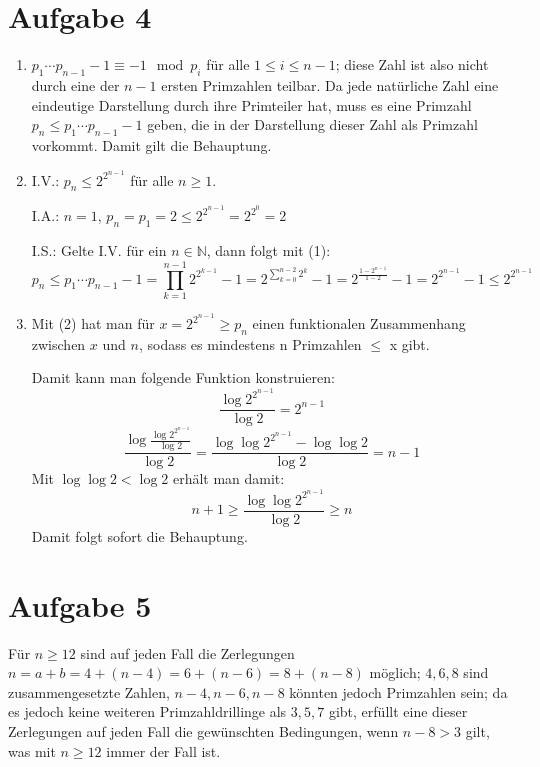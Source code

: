 \section*{Aufgabe 4}
\begin{enumerate}[(1)]
\item
$p_1\cdots p_{n-1} - 1 \equiv -1 \mod p_i$ für alle $ 1 \leq i \leq n-1$; diese Zahl ist also nicht durch eine der $n-1$ ersten Primzahlen teilbar.
Da jede natürliche Zahl eine eindeutige Darstellung durch ihre Primteiler hat, muss es eine Primzahl $p_n \leq p_1\cdots p_{n-1} - 1$ geben, die in der Darstellung dieser Zahl als Primzahl vorkommt.
Damit gilt die Behauptung.

\item
I.V.: $p_n \leq 2^{2^{n-1}}$ für alle $n \geq 1$.

I.A.: $n = 1$, $p_n = p_1 = 2 \leq 2^{2^{n-1}} = 2^{2^0} = 2$

I.S.: Gelte I.V. für ein $n \in \mathbb{N}$, dann folgt mit (1):
\[ p_n \leq p_1 \cdots p_{n-1} - 1 = \prod_{k=1}^{n-1}{ 2^{2^{k-1}}} - 1 =  2^{\sum_{k=0}^{n-2}2^k} - 1 = 2^{\frac{1- 2^{n-1}}{1-2}} - 1 = 2^{2^{n-1}} - 1 \leq 2^{2^{n-1}}\]

\item
Mit (2) hat man für $ x= 2^{2^{n-1}} \geq p_n$ einen funktionalen Zusammenhang zwischen $x$ und $n$, sodass es mindestens n Primzahlen $\leq$ x gibt.

Damit kann man folgende Funktion konstruieren:
\[ \frac{\log 2^{2^{n-1}}}{\log 2} = 2^{n-1} \]
\[ \frac{\log \frac{\log 2^{2^{n-1}}}{\log 2}}{\log 2} = \frac{\log\log 2^{2^{n-1}} - \log\log 2}{\log 2} = n-1 \]
Mit $\log\log 2 < \log 2$ erhält man damit:
\[ n+1 \geq \frac{\log\log{2^{2^{n-1}}}}{\log 2} \geq n \]
Damit folgt sofort die Behauptung.


\end{enumerate}


\section*{Aufgabe 5}

Für $n \geq 12$ sind auf jeden Fall die Zerlegungen $n = a + b = 4 + (n-4) = 6 + (n-6) = 8 + (n-8)$ möglich; $4, 6, 8$ sind zusammengesetzte Zahlen, $n-4, n-6, n-8$ könnten jedoch Primzahlen sein; da es jedoch keine weiteren Primzahldrillinge als $3, 5, 7$ gibt, erfüllt eine dieser Zerlegungen auf jeden Fall die gewünschten Bedingungen, wenn $n-8 > 3$ gilt, was mit $n \geq 12$ immer der Fall ist.